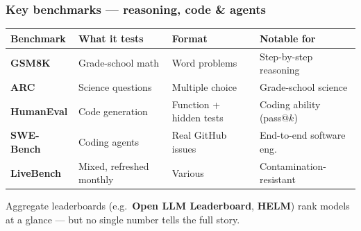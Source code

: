 \documentclass[aspectratio=169]{beamer}
\begin{document}
\begin{frame}
\frametitle{Key benchmarks --- reasoning, code \& agents}
\vspace{-0.1cm}
\renewcommand{\arraystretch}{1.5}
\begin{center}
{\small
\begin{tabular}{>{\bfseries}l l l l}
  \textbf{Benchmark} & \textbf{What it tests} & \textbf{Format} & \textbf{Notable for} \\
  \hline
  \textcolor{sampred}{GSM8K} & Grade-school math & Word problems & Step-by-step reasoning \\
  \textcolor{popblue}{ARC} & Science questions & Multiple choice & Grade-school science \\
  \textcolor{paramgreen}{HumanEval} & Code generation & Function + hidden tests & Coding ability (pass@$k$) \\
  \textcolor{orange1}{SWE-Bench} & Coding agents & Real GitHub issues & End-to-end software eng. \\
  \textcolor{paramgreen}{LiveBench} & Mixed, refreshed monthly & Various & Contamination-resistant \\
  \hline
\end{tabular}
}
\end{center}
\vspace{0.35cm}
\begin{center}
{\small Aggregate leaderboards (e.g.\ \textbf{Open LLM Leaderboard}, \textbf{HELM}) rank models at a glance --- but no single number tells the full story.}
\end{center}
\end{frame}
\end{document}
